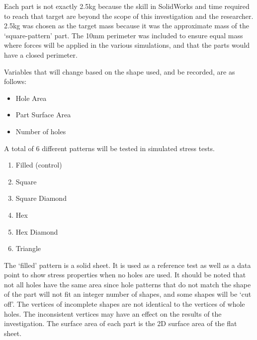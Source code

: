 \documentclass[12pt, letterpaper]{article}
\newcommand{\sorta}[1]{`#1'}
\begin{document}
Each part is not exactly 2.5kg because the skill in SolidWorks and time required to reach that target are beyond the scope of this investigation and the researcher. 2.5kg was chosen as the target mass because it was the approximate mass of the \sorta{square-pattern} part. The 10mm perimeter was included to ensure equal mass where forces will be applied in the various simulations, and that the parts would have a closed perimeter. 

Variables that will change based on the shape used, and be recorded, are as follows:

\begin{itemize}
\item Hole Area
\item Part Surface Area
\item Number of holes
\end{itemize}

A total of 6 different patterns will be tested in simulated stress tests.

\begin{enumerate}
\item Filled (control)
\item Square
\item Square Diamond
\item Hex
\item Hex Diamond
\item Triangle
\end{enumerate}

The \sorta{filled} pattern is a solid sheet. It is used as a reference test as well as a data point to show stress properties when no holes are used. It should be noted that not all holes have the same area since hole patterns that do not match the shape of the part will not fit an integer number of shapes, and some shapes will be \sorta{cut off}. The vertices of incomplete shapes are not identical to the vertices of whole holes. The inconsistent vertices may have an effect on the results of the investigation. The surface area of each part is the 2D surface area of the flat sheet. 
\end{document}
